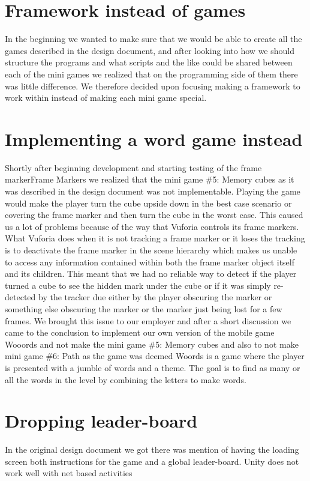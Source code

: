 \section{Framework instead of games}
In the beginning we wanted to make sure that we would be able to create all the games described in the design document, and after looking into how we should structure the programs and what scripts and the like could be shared between each of the mini games we realized that on the programming side of them there was little difference. We therefore decided upon focusing making a framework to work within instead of making each mini game special.

\section{Implementing a word game instead}
Shortly after beginning development and starting testing of the frame marker\gls{Frame Marker}s we realized that the mini game \#5: Memory cubes as it was described in the design document was not implementable. Playing the game would make the player turn the cube upside down in the best case scenario or covering the frame marker and then turn the cube in the worst case. This caused us a lot of problems because of the way that Vuforia controls its frame markers. What Vuforia does when it is not tracking a frame marker or it loses the tracking is to deactivate the frame marker in the scene hierarchy which makes us unable to access any information contained within both the frame marker object itself and its children. This meant that we had no reliable way to detect if the player turned a cube to see the hidden mark under the cube or if it was simply re-detected by the tracker due either by the player obscuring the marker or something else obscuring the marker or the marker just being lost for a few frames. We brought this issue to our employer and after a short discussion we came to the conclusion to implement our own version of the mobile game Wooords and not make the mini game \#5: Memory cubes and also to not make mini game \#6: Path as the game was deemed %
Woords is a game where the player is presented with a jumble of words and a theme. The goal is to find as many or all the words in the level by combining the letters to make words.


\section{Dropping leader-board}
In the original design document we got there was mention of having the loading screen both instructions for the game and a global leader-board. Unity does not work well with net based activities 

